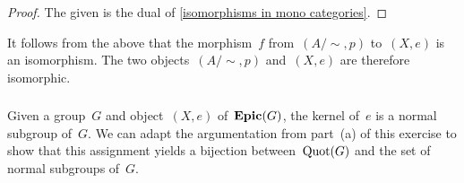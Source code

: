 \begin{proof}
	The given  is the dual of \cref{isomorphisms in mono categories}.
\end{proof}

It follows from the above  that the morphism~$f$ from~$(A / {∼}, p)$ to~$(X, e)$ is an isomorphism.
The two objects~$(A / {∼}, p)$ and~$(X, e)$ are therefore isomorphic.



\subsubsection{}

Given a group~$G$ and object~$(X, e)$ of~$\mathbf{Epic}(G)$, the kernel of~$e$ is a normal subgroup of~$G$.
We can adapt the argumentation from part~(a) of this exercise to show that this assignment yields a bijection between~$\operatorname{Quot}(G)$ and the set of normal subgroups of~$G$.
